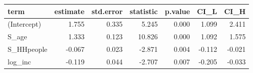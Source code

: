 \begin{tabular}{lrrrrrr}
  \hline
term & estimate & std.error & statistic & p.value & CI\_L & CI\_H \\ 
  \hline
(Intercept) & 1.755 & 0.335 & 5.245 & 0.000 & 1.099 & 2.411 \\ 
  S\_age & 1.333 & 0.123 & 10.826 & 0.000 & 1.092 & 1.575 \\ 
  S\_HHpeople & -0.067 & 0.023 & -2.871 & 0.004 & -0.112 & -0.021 \\ 
  log\_inc & -0.119 & 0.044 & -2.707 & 0.007 & -0.205 & -0.033 \\ 
   \hline
\end{tabular}
